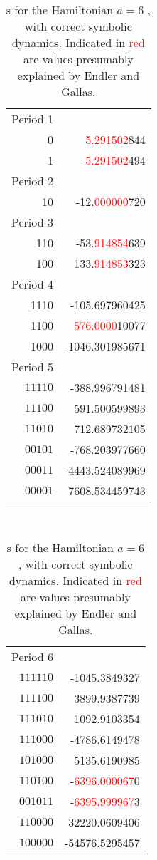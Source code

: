 \begin{description}
\begin{table} %
\caption{ %
         {\HillDet}s for the Hamiltonian $a=6$ {\HenonMap},
         with correct symbolic dynamics.
         Indicated in \textcolor{red}{red} are values
         presumably explained by Endler and Gallas.
         }
\centering %
\begin{tabular}{|r r|} %
\hline
Period 1 & \\ [0.5ex]
0 &  \textcolor{red}{5.291502}844 \\
1 & -\textcolor{red}{5.291502}494 \\
[1ex]
\hline
Period 2 & \\ [0.5ex]
10 & -12.\textcolor{red}{000000}720 \\
[1ex]
\hline %
Period 3 & \\ [0.5ex] %
110 & -53.\textcolor{red}{914854}639 \\ %
100 & 133.\textcolor{red}{914853}323 \\
[1ex]
\hline
Period 4 & \\ [0.5ex]  %
1110 & -105.697960425 \\
1100 & \textcolor{red}{576.0000}10077 \\
1000 & -1046.301985671 \\
[1ex]
\hline
Period 5 & \\ [0.5ex]
 $11110$ & -388.996791481 \\
 $11100$  & 591.500599893 \\
 $11010$ &  712.689732105 \\
 $00101$ & -768.203977660 \\
 $00011$ & -4443.524089969 \\
 $00001$  & 7608.534459743 \\
[1ex]
\hline
\end{tabular}
~~~~
\begin{tabular}{|r r|} %
\hline
Period 6 & \\ [0.5ex]
 $111110$ & -1045.3849327 \\
 $111100$ &  3899.9387739 \\
 $111010$ &  1092.9103354 \\
 $111000$ & -4786.6149478 \\
 $101000$ &  5135.6190985 \\
 $110100$ & -\textcolor{red}{6396.000067}0 \\
 $001011$ & -\textcolor{red}{6395.999967}3 \\
 $110000$ & 32220.0609406 \\
 $100000$ &-54576.5295457 \\[1ex]
\hline
\end{tabular}
\label{tab:orbitdet} %
\end{table}


\end{description}
